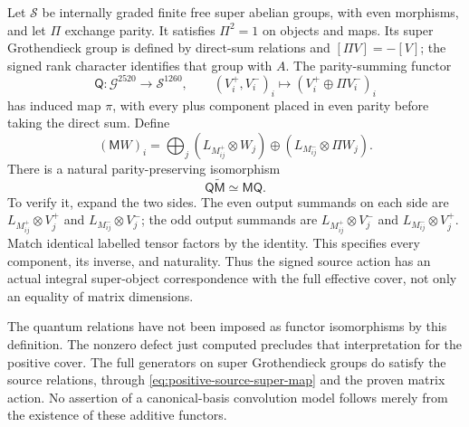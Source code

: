 Let $\mathcal S$ be internally graded finite free super abelian
groups, with even morphisms, and let $\Pi$ exchange parity.
It satisfies $\Pi^2=1$ on objects and maps. Its super Grothendieck
group is defined by direct-sum relations and $[\Pi V]=-[V]$;
the signed rank character identifies that group with $A$.
The parity-summing functor
\[
 \mathsf Q:\mathcal G^{2520}\to\mathcal S^{1260},\qquad
 (V_i^+,V_i^-)_i\longmapsto(V_i^+\oplus\Pi V_i^-)_i
\]
has induced map $\pi$, with every plus component placed in even
parity before taking the direct sum. Define
\[
 (\mathsf M W)_i=\bigoplus_j
   \left(L_{M^+_{ij}}\otimes W_j\right)
   \oplus\left(L_{M^-_{ij}}\otimes\Pi W_j\right).
\]
There is a natural parity-preserving isomorphism
\begin{equation}\label{eq:positive-source-super-map}
 \mathsf Q\widetilde{\mathsf M}\simeq\mathsf M\mathsf Q.
\end{equation}
To verify it, expand the two sides. The even output summands on
each side are $L_{M^+_{ij}}\otimes V_j^+$ and
$L_{M^-_{ij}}\otimes V_j^-$; the odd output summands are
$L_{M^+_{ij}}\otimes V_j^-$ and
$L_{M^-_{ij}}\otimes V_j^+$. Match identical labelled tensor
factors by the identity. This specifies every component, its inverse,
and naturality. Thus the signed source action has an actual integral
super-object correspondence with the full effective cover, not only
an equality of matrix dimensions.

The quantum relations have not been imposed as functor isomorphisms
by this definition. The nonzero defect just computed precludes that
interpretation for the positive cover. The full generators on
super Grothendieck groups do satisfy the source relations, through
\eqref{eq:positive-source-super-map} and the proven matrix action.
No assertion of a canonical-basis convolution model follows merely
from the existence of these additive functors.

